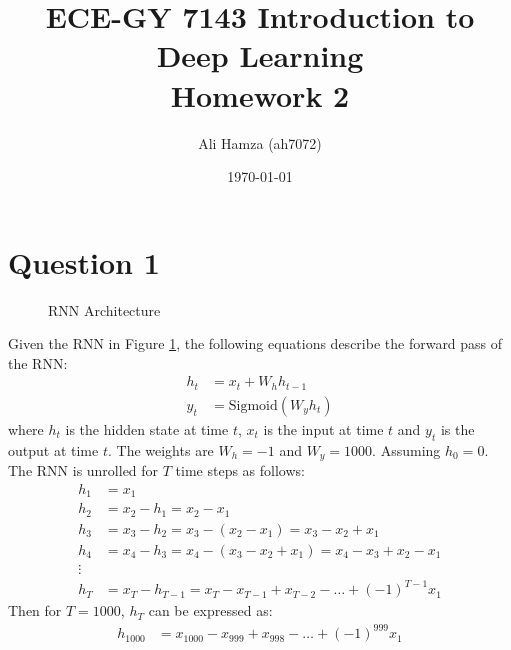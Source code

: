 \documentclass{article}
\title{ECE-GY 7143 Introduction to Deep Learning \\ \Large Homework 2}
\author{Ali Hamza (ah7072)}
\date{\today}
\begin{document}
\maketitle
\newpage
\section*{Question 1}
\begin{figure}[ht]
    \centering
    \caption{RNN Architecture}
    \label{rnn_architecture}
\end{figure}
\noindent Given the RNN in Figure \ref{rnn_architecture}, the following equations describe the forward pass of the RNN:
\begin{align*}
    h_t &= x_t + W_h h_{t-1}\\
    y_t &= \text{Sigmoid}(W_y h_t)
\end{align*}
where $h_t$ is the hidden state at time $t$, $x_t$ is the input at time $t$ and $y_t$ is the output at time $t$. The weights are $W_h = -1$ and $W_y = 1000$. 
Assuming $h_0 = 0$. The RNN is unrolled for $T$ time steps as follows:
\begin{align*}
    h_1 &= x_1\\
    h_2 &= x_2 - h_1 = x_2 - x_1\\
    h_3 &= x_3 - h_2 = x_3 - (x_2 - x_1) = x_3 - x_2 + x_1\\
    h_4 &= x_4 - h_3 = x_4 - (x_3 - x_2 + x_1) = x_4 - x_3 + x_2 - x_1\\
    \vdots \\
    h_T &= x_T - h_{T-1} = x_T - x_{T-1} + x_{T-2} - \ldots + (-1)^{T-1} x_1
\end{align*}
Then for $T=1000$, $h_T$ can be expressed as:
\begin{align*}
    h_{1000} &= x_{1000} - x_{999} + x_{998} - \ldots + (-1)^{999} x_1
\end{align*}
\end{document}
